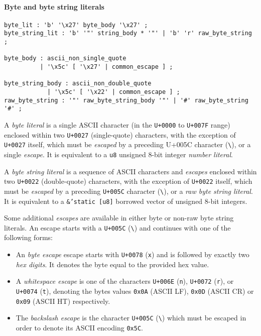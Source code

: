 \documentclass[]{article}
\begin{document}
\paragraph{Byte and byte string
literals}\label{byte-and-byte-string-literals}

\begin{verbatim}
byte_lit : 'b' '\x27' byte_body '\x27' ;
byte_string_lit : 'b' '"' string_body * '"' | 'b' 'r' raw_byte_string ;

byte_body : ascii_non_single_quote
          | '\x5c' [ '\x27' | common_escape ] ;

byte_string_body : ascii_non_double_quote
            | '\x5c' [ '\x22' | common_escape ] ;
raw_byte_string : '"' raw_byte_string_body '"' | '#' raw_byte_string '#' ;
\end{verbatim}

A \emph{byte literal} is a single ASCII character (in the
\texttt{U+0000} to \texttt{U+007F} range) enclosed within two
\texttt{U+0027} (single-quote) characters, with the exception of
\texttt{U+0027} itself, which must be \emph{escaped} by a preceding
U+005C character (\texttt{\textbackslash{}}), or a single \emph{escape}.
It is equivalent to a \texttt{u8} unsigned 8-bit integer \emph{number
literal}.

A \emph{byte string literal} is a sequence of ASCII characters and
\emph{escapes} enclosed within two \texttt{U+0022} (double-quote)
characters, with the exception of \texttt{U+0022} itself, which must be
\emph{escaped} by a preceding \texttt{U+005C} character
(\texttt{\textbackslash{}}), or a \emph{raw byte string literal}. It is
equivalent to a \texttt{\&'static {[}u8{]}} borrowed vector of unsigned
8-bit integers.

Some additional \emph{escapes} are available in either byte or non-raw
byte string literals. An escape starts with a \texttt{U+005C}
(\texttt{\textbackslash{}}) and continues with one of the following
forms:

\begin{itemize}
\itemsep1pt\parskip0pt
\item
  An \emph{byte escape} escape starts with \texttt{U+0078} (\texttt{x})
  and is followed by exactly two \emph{hex digits}. It denotes the byte
  equal to the provided hex value.
\item
  A \emph{whitespace escape} is one of the characters \texttt{U+006E}
  (\texttt{n}), \texttt{U+0072} (\texttt{r}), or \texttt{U+0074}
  (\texttt{t}), denoting the bytes values \texttt{0x0A} (ASCII LF),
  \texttt{0x0D} (ASCII CR) or \texttt{0x09} (ASCII HT) respectively.
\item
  The \emph{backslash escape} is the character \texttt{U+005C}
  (\texttt{\textbackslash{}}) which must be escaped in order to denote
  its ASCII encoding \texttt{0x5C}.
\end{itemize}
\end{document}
